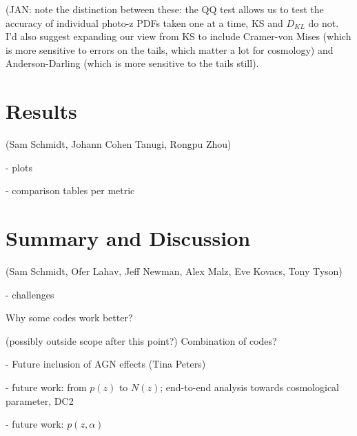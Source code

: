 \documentclass[usenatbib]{mn2e}
\begin{document}
(JAN: note the distinction between these: the QQ test allows us to test the accuracy of individual  photo-z PDFs taken one at a time, KS and $D_{KL}$ do not.  I'd also suggest expanding our view from KS to include Cramer-von Mises (which is more sensitive to errors on the tails, which matter a lot for cosmology) and Anderson-Darling (which is more sensitive to the tails still).

\section{Results}\label{results}

(Sam Schmidt, Johann Cohen Tanugi, Rongpu Zhou)

- plots

- comparison tables per metric

\section{Summary and Discussion}\label{discussion}


(Sam Schmidt, Ofer Lahav, Jeff Newman, Alex Malz, Eve Kovacs, Tony Tyson)

- challenges

Why some codes work better?

(possibly outside scope after this point?)
Combination of codes? 

-  Future inclusion of AGN effects (Tina Peters)

- future work: from $p(z)$ to $N(z)$; end-to-end analysis towards cosmological parameter, DC2

- future work: $p(z,\alpha)$



\end{document}
